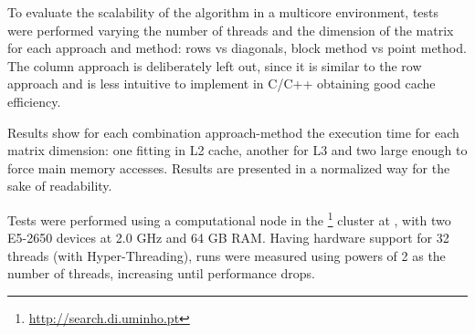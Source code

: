 
To evaluate the scalability of the algorithm in a multicore environment, tests were performed varying the number of threads and the dimension of the matrix for each approach and method: rows vs diagonals, block method vs point method. The column approach is deliberately left out, since it is similar to the row approach and is less intuitive to implement in C/C++ obtaining good cache efficiency.

Results show for each combination approach-method the execution time for each matrix dimension: one fitting in L2 cache, another for L3 and two large enough to force main memory accesses.
Results are presented in a normalized way for the sake of readability.

Tests were performed using a computational node in the \search\footnote{\url{http://search.di.uminho.pt}} cluster at \uminho, with two \intel\xeon E5-2650 devices at 2.0 GHz and 64 GB RAM. Having hardware support for 32 threads (with Hyper-Threading), runs were measured using powers of 2 as the number of threads, increasing until performance drops.
